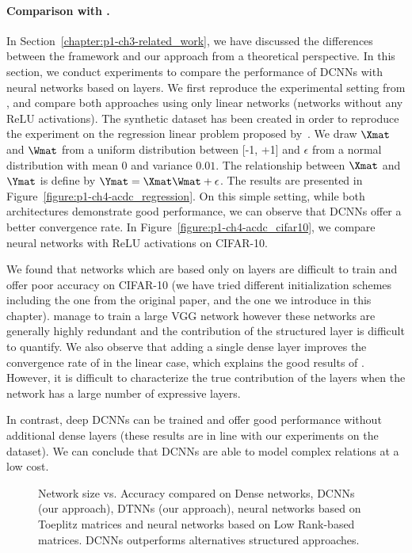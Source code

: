\paragraph{Comparison with \ACDC \citep{moczulski2016acdc}.}

In Section~\ref{chapter:p1-ch3-related_work}, we have discussed the differences between the \ACDC framework and our approach from a theoretical perspective.
In this section, we conduct experiments to compare the performance of DCNNs with neural networks based on \ACDC layers. 
We first reproduce the experimental setting from \citet{moczulski2016acdc}, and compare both approaches using only linear networks (\ie networks without any ReLU activations).
The synthetic dataset has been created in order to reproduce the experiment on the regression linear problem proposed by~\citet{moczulski2016acdc}.
We draw $\Xmat$ and $\Wmat$ from a uniform distribution between [-1, +1] and $\epsilon$ from a normal distribution with mean 0 and variance $0.01$.
The relationship between $\Xmat$ and $\Ymat$ is define by $\Ymat = \Xmat\Wmat + \epsilon$. 
The results are presented in Figure~\ref{figure:p1-ch4-acdc_regression}.
On this simple setting, while both architectures demonstrate good performance, we can observe that DCNNs offer a better convergence rate.
In Figure~\ref{figure:p1-ch4-acdc_cifar10}, we compare neural networks with ReLU activations on CIFAR-10. 

We found that networks which are based only on \ACDC layers are difficult to train and offer poor accuracy on CIFAR-10 (we have tried different initialization schemes including the one from the original paper, and the one we introduce in this chapter).
\citet{moczulski2016acdc} manage to train a large VGG network  however these networks are generally highly redundant and the contribution of the structured layer is difficult to quantify. 
We also observe that adding a single dense layer improves the convergence rate of \ACDC in the linear case, which explains the good results of \citet{moczulski2016acdc}.
However, it is difficult to characterize the true contribution of the \ACDC layers when the network has a large number of expressive layers.

In contrast, deep DCNNs can be trained and offer good performance without additional dense layers (these results are in line with our experiments on the \yt dataset).
We can conclude that DCNNs are able to model complex relations at a low cost. 

\begin{figure}
   \centering
   
   \caption{Network size vs. Accuracy compared on Dense networks, DCNNs (our approach), DTNNs (our approach), neural networks based on Toeplitz matrices and neural networks based on Low Rank-based matrices. DCNNs outperforms alternatives structured approaches.}
   \label{figure:p1-ch4-cifar10_type}
\end{figure}

